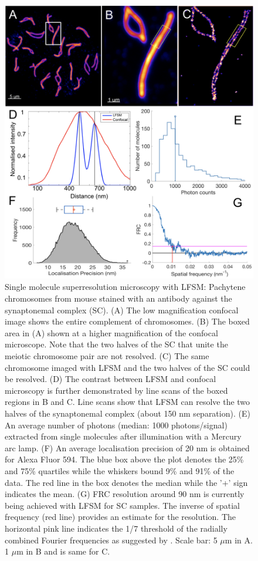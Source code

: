 \documentclass[9pt,twocolumn,twoside]{pnas-new}
\begin{document}
\begin{figure}[h!]
\begin{center}
\includegraphics[width=\linewidth]{Figures/Fig3.png}
\end{center}
\caption[]{Single molecule superresolution microscopy with LFSM: Pachytene chromosomes from mouse stained with an antibody against the synaptonemal complex (SC). (A) The low magnification confocal image shows the entire complement of chromosomes. (B) The boxed area in (A) shown at a higher magnification of the confocal microscope. Note that the two halves of the SC that unite the meiotic chromosome pair are not resolved. (C) The same chromosome imaged with LFSM and the two halves of the SC could be resolved. (D) The contrast between LFSM and confocal microscopy is further demonstrated by line scans of the boxed regions in B and C. Line scans show that LFSM can resolve the two halves of the synaptonemal complex (about 150 nm separation). (E) An average number of photons (median: 1000 photons/signal) extracted from single molecules after illumination with a Mercury arc lamp. (F) An average localisation precision of 20 nm is obtained for Alexa Fluor 594. The blue box above the plot denotes the 25\% and 75\% quartiles while the whiskers bound 9\% and 91\% of the data. The red line in the box denotes the median while the '+' sign indicates the mean. (G) FRC resolution around 90 nm is currently being achieved with LFSM for SC samples. The inverse of spatial frequency (red line) provides an estimate for the resolution. The horizontal pink line indicates the 1/7 threshold of the radially combined Fourier frequencies as suggested by \citep{nieuwenhuizen2013}. Scale bar: 5 $\mu$m in A. 1 $\mu$m in B and is same for C. } \label{fig:superres}
\end{figure}
\end{document}
